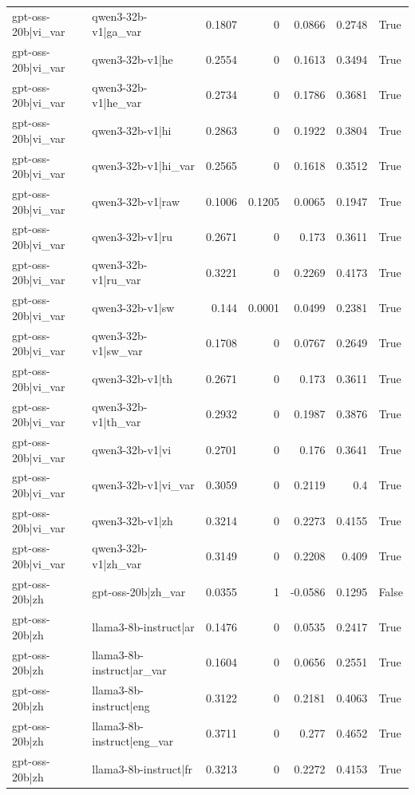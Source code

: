 \begin{table}
\begin{tabular}{l l r r r r l}
gpt-oss-20b|vi_var & qwen3-32b-v1|ga_var & 0.1807 & 0 & 0.0866 & 0.2748 & True \\
gpt-oss-20b|vi_var & qwen3-32b-v1|he & 0.2554 & 0 & 0.1613 & 0.3494 & True \\
gpt-oss-20b|vi_var & qwen3-32b-v1|he_var & 0.2734 & 0 & 0.1786 & 0.3681 & True \\
gpt-oss-20b|vi_var & qwen3-32b-v1|hi & 0.2863 & 0 & 0.1922 & 0.3804 & True \\
gpt-oss-20b|vi_var & qwen3-32b-v1|hi_var & 0.2565 & 0 & 0.1618 & 0.3512 & True \\
gpt-oss-20b|vi_var & qwen3-32b-v1|raw & 0.1006 & 0.1205 & 0.0065 & 0.1947 & True \\
gpt-oss-20b|vi_var & qwen3-32b-v1|ru & 0.2671 & 0 & 0.173 & 0.3611 & True \\
gpt-oss-20b|vi_var & qwen3-32b-v1|ru_var & 0.3221 & 0 & 0.2269 & 0.4173 & True \\
gpt-oss-20b|vi_var & qwen3-32b-v1|sw & 0.144 & 0.0001 & 0.0499 & 0.2381 & True \\
gpt-oss-20b|vi_var & qwen3-32b-v1|sw_var & 0.1708 & 0 & 0.0767 & 0.2649 & True \\
gpt-oss-20b|vi_var & qwen3-32b-v1|th & 0.2671 & 0 & 0.173 & 0.3611 & True \\
gpt-oss-20b|vi_var & qwen3-32b-v1|th_var & 0.2932 & 0 & 0.1987 & 0.3876 & True \\
gpt-oss-20b|vi_var & qwen3-32b-v1|vi & 0.2701 & 0 & 0.176 & 0.3641 & True \\
gpt-oss-20b|vi_var & qwen3-32b-v1|vi_var & 0.3059 & 0 & 0.2119 & 0.4 & True \\
gpt-oss-20b|vi_var & qwen3-32b-v1|zh & 0.3214 & 0 & 0.2273 & 0.4155 & True \\
gpt-oss-20b|vi_var & qwen3-32b-v1|zh_var & 0.3149 & 0 & 0.2208 & 0.409 & True \\
gpt-oss-20b|zh & gpt-oss-20b|zh_var & 0.0355 & 1 & -0.0586 & 0.1295 & False \\
gpt-oss-20b|zh & llama3-8b-instruct|ar & 0.1476 & 0 & 0.0535 & 0.2417 & True \\
gpt-oss-20b|zh & llama3-8b-instruct|ar_var & 0.1604 & 0 & 0.0656 & 0.2551 & True \\
gpt-oss-20b|zh & llama3-8b-instruct|eng & 0.3122 & 0 & 0.2181 & 0.4063 & True \\
gpt-oss-20b|zh & llama3-8b-instruct|eng_var & 0.3711 & 0 & 0.277 & 0.4652 & True \\
gpt-oss-20b|zh & llama3-8b-instruct|fr & 0.3213 & 0 & 0.2272 & 0.4153 & True \\

\end{tabular}
\end{table}
